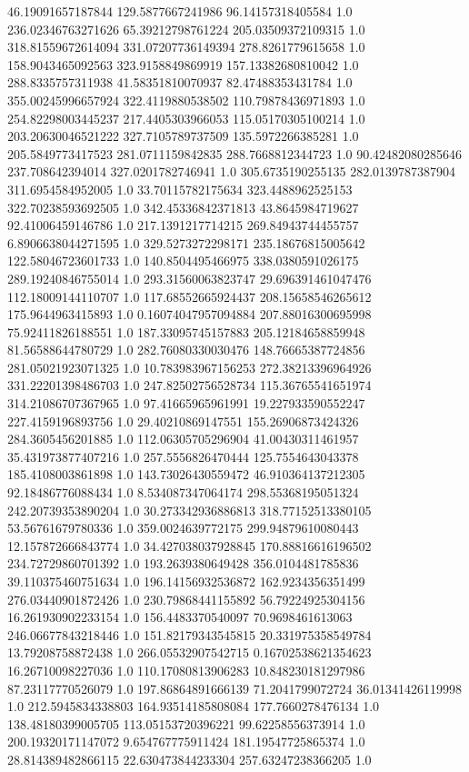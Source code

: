 46.19091657187844	129.5877667241986	96.14157318405584	1.0
236.02346763271626	65.39212798761224	205.03509372109315	1.0
318.81559672614094	331.07207736149394	278.8261779615658	1.0
158.9043465092563	323.9158849869919	157.13382680810042	1.0
288.8335757311938	41.58351810070937	82.47488353431784	1.0
355.00245996657924	322.4119880538502	110.79878436971893	1.0
254.82298003445237	217.4405303966053	115.05170305100214	1.0
203.20630046521222	327.7105789737509	135.5972266385281	1.0
205.5849773417523	281.0711159842835	288.7668812344723	1.0
90.42482080285646	237.708642394014	327.0201782746941	1.0
305.6735190255135	282.0139787387904	311.6954584952005	1.0
33.70115782175634	323.4488962525153	322.70238593692505	1.0
342.45336842371813	43.8645984719627	92.41006459146786	1.0
217.1391217714215	269.84943744455757	6.8906638044271595	1.0
329.5273272298171	235.18676815005642	122.58046723601733	1.0
140.8504495466975	338.0380591026175	289.19240846755014	1.0
293.31560063823747	29.696391461047476	112.18009144110707	1.0
117.68552665924437	208.15658546265612	175.9644963415893	1.0
0.16074047957094884	207.88016300695998	75.92411826188551	1.0
187.33095745157883	205.12184658859948	81.56588644780729	1.0
282.76080330030476	148.76665387724856	281.05021923071325	1.0
10.783983967156253	272.38213396964926	331.22201398486703	1.0
247.82502756528734	115.36765541651974	314.21086707367965	1.0
97.41665965961991	19.227933590552247	227.4159196893756	1.0
29.40210869147551	155.26906873424326	284.3605456201885	1.0
112.06305705296904	41.00430311461957	35.431973877407216	1.0
257.5556826470444	125.7554643043378	185.4108003861898	1.0
143.73026430559472	46.910364137212305	92.18486776088434	1.0
8.534087347064174	298.55368195051324	242.20739353890204	1.0
30.273342936886813	318.77152513380105	53.56761679780336	1.0
359.0024639772175	299.94879610080443	12.157872666843774	1.0
34.427038037928845	170.88816616196502	234.72729860701392	1.0
193.2639380649428	356.0104481785836	39.110375460751634	1.0
196.14156932536872	162.9234356351499	276.03440901872426	1.0
230.79868441155892	56.79224925304156	16.261930902233154	1.0
156.4483370540097	70.9698461613063	246.06677843218446	1.0
151.82179343545815	20.331975358549784	13.79208758872438	1.0
266.05532907542715	0.16702538621354623	16.26710098227036	1.0
110.17080813906283	10.848230181297986	87.23117770526079	1.0
197.86864891666139	71.2041799072724	36.01341426119998	1.0
212.5945834338803	164.93514185808084	177.7660278476134	1.0
138.48180399005705	113.05153720396221	99.62258556373914	1.0
200.19320171147072	9.654767775911424	181.19547725865374	1.0
28.814389482866115	22.630473844233304	257.63247238366205	1.0
